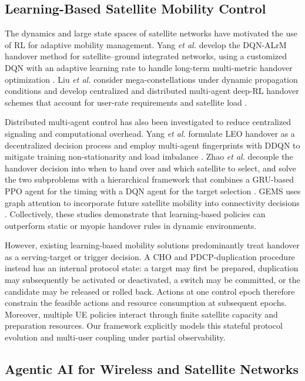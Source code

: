 \documentclass[journal]{IEEEtran}
\begin{document}
\subsection{Learning-Based Satellite Mobility Control}

The dynamics and large state spaces of satellite networks have
motivated the use of RL for adaptive mobility management. Yang
\emph{et al.} develop the DQN-ALrM handover method for
satellite--ground integrated networks, using a customized DQN with an
adaptive learning rate to handle long-term multi-metric handover
optimization \cite{yang2023dqn}. Liu \emph{et al.} consider
mega-constellations under dynamic propagation conditions and develop
centralized and distributed multi-agent deep-RL handover schemes that
account for user-rate requirements and satellite load
\cite{liu2024marlho}.

Distributed multi-agent control has also been investigated to reduce
centralized signaling and computational overhead. Yang \emph{et al.}
formulate LEO handover as a decentralized decision process and employ
multi-agent fingerprints with DDQN to mitigate training
non-stationarity and load imbalance
\cite{yang2024fingerprints}. Zhao \emph{et al.} decouple the handover decision
into when to hand over and which satellite to select, and solve the two
subproblems with a hierarchical framework that combines a GRU-based PPO agent
for the timing with a DQN agent for the target selection
\cite{zhao2026hrl}. GEMS uses graph attention to incorporate
future satellite mobility into connectivity decisions
\cite{wang2026gems}. Collectively, these studies demonstrate that
learning-based policies can outperform static or myopic handover
rules in dynamic environments.

However, existing learning-based mobility solutions predominantly
treat handover as a serving-target or trigger decision. A CHO and
PDCP-duplication procedure instead has an internal protocol state:
a target may first be prepared, duplication may subsequently be
activated or deactivated, a switch may be committed, or the candidate
may be released or rolled back. Actions at one control epoch therefore
constrain the feasible actions and resource consumption at subsequent
epochs. Moreover, multiple UE policies interact through finite
satellite capacity and preparation resources. Our framework explicitly
models this stateful protocol evolution and multi-user coupling under
partial observability.

\subsection{Agentic AI for Wireless and Satellite Networks}
\end{document}
